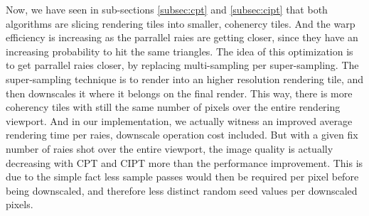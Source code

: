 Now, we have seen in sub-sections \ref{subsec:cpt} and \ref{subsec:cipt} that
both algorithms are slicing rendering tiles into smaller, cohenercy tiles. And
the warp efficiency is increasing as the parrallel raies are getting closer, since
they have an increasing probability to hit the same triangles. The idea of this
optimization is to get parrallel raies closer, by replacing multi-sampling per
super-sampling. The super-sampling technique is to render into an higher resolution
rendering tile, and then downscales it where it belongs on the final render. This
way, there is more coherency tiles with still the same number of pixels over the
entire rendering viewport. And in our implementation, we actually witness an
improved average rendering time per raies, downscale operation cost included.
But with a given fix number of raies shot over the entire viewport, the image
quality is actually decreasing with CPT and CIPT more than the performance
improvement. This is due to the simple fact less sample passes would then be required
per pixel before being downscaled, and therefore less distinct random seed values per
downscaled pixels.
